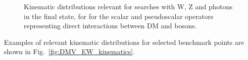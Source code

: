\begin{figure}[h!]
  \centering  
    \hfill
    \caption{Kinematic distributions relevant for searches with W, Z and photons in the final state, 
    for for the scalar and pseudoscalar operators representing direct interactions between DM and bosons.}
    \label{fig:EFTD7_EW_kinematics}
    
\end{figure}

Examples of relevant kinematic distributions for selected benchmark points are
shown in Fig.~\ref{fig:DMV_EW_kinematics}.

